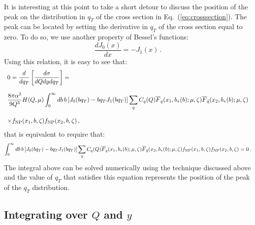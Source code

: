 \documentclass[10pt,a4paper]{article}
\begin{document}
It is interesting at this point to take a short detour to discuss the
position of the peak on the distribution in $q_T$ of the cross section
in Eq.~(\ref{eq:crosssection}). The peak can be located by setting the
derivative in $q_T$ of the cross section equal to zero. To do so, we
use another property of Bessel's functions:
\begin{equation}
\frac{dJ_0(x)}{dx} = -J_1(x)\,.
\end{equation}
Using this relation, it is easy to see that:
\begin{equation}
\begin{array}{l}
\displaystyle 0 = \frac{d}{dq_T}  \left[\frac{d\sigma}{dQ dy dq_T}\right]
  =\\
\\
\displaystyle  \frac{8\pi\alpha^2}{9 Q^3} H(Q,\mu) 
  \int_0^\infty db\,b \left[J_0(bq_T) -bq_TJ_1(bq_T)\right] 
\sum_q C_q(Q)\overline{F}_q(x_1,b_*(b);\mu,\zeta)
  \overline{F}_{\bar{q}}(x_2,b_*(b);\mu,\zeta)\\
\\
\displaystyle \times f_{\rm NP}(x_1,b,\zeta)
  f_{\rm NP}(x_2,b,\zeta)\,,
\end{array}
\end{equation}
that is equivalent to require that:
\begin{equation}
  \int_0^\infty db\,b \left[J_0(bq_T) -bq_TJ_1(bq_T)\right] 
  \sum_q C_q(Q)\overline{F}_q(x_1,b_*(b);\mu,\zeta) \overline{F}_{\bar{q}}(x_2,b_*(b);\mu,\zeta) f_{\rm NP}(x_1,b,\zeta)
  f_{\rm NP}(x_2,b,\zeta) = 0\,.
\end{equation}
The integral above can be solved numerically using the technique
discussed above and the value of $q_T$ that satisfies this equation
represents the position of the peak of the $q_T$ distribution.

\subsection{Integrating over $Q$ and $y$}\label{sec:QyInt}
\end{document}
